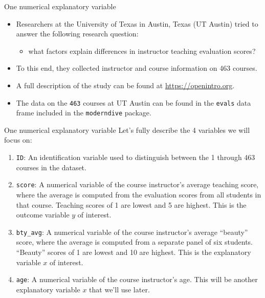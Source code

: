 \documentclass[
  ignorenonframetext,
]{beamer}
\providecommand{\tightlist}{%
  \setlength{\itemsep}{0pt}\setlength{\parskip}{0pt}}
\begin{document}
\begin{frame}[fragile]{One numerical explanatory variable}
\protect{}\label{one-numerical-explanatory-variable}
\begin{itemize}
\item
  Researchers at the University of Texas in Austin, Texas (UT Austin)
  tried to answer the following research question:

  \begin{itemize}
  \tightlist
  \item
    what factors explain differences in instructor teaching evaluation
    scores?
  \end{itemize}
\item
  To this end, they collected instructor and course information on 463
  courses.
\item
  A full description of the study can be found at
  \url{https://openintro.org}.
\item
  The data on the \texttt{463} courses at UT Austin can be found in the
  \texttt{evals} data frame included in the \texttt{moderndive} package.
\end{itemize}
\end{frame}

\begin{frame}[fragile]{One numerical explanatory variable}
\protect{}\label{one-numerical-explanatory-variable-1}
Let's fully describe the 4 variables we will focus on:

\begin{enumerate}
\item
  \texttt{ID}: An identification variable used to distinguish between
  the 1 through 463 courses in the dataset.
\item
  \texttt{score}: A numerical variable of the course instructor's
  average teaching score, where the average is computed from the
  evaluation scores from all students in that course. Teaching scores of
  1 are lowest and 5 are highest. This is the outcome variable \(y\) of
  interest.
\item
  \texttt{bty\_avg}: A numerical variable of the course instructor's
  average ``beauty'' score, where the average is computed from a
  separate panel of six students. ``Beauty'' scores of 1 are lowest and
  10 are highest. This is the explanatory variable \(x\) of interest.
\item
  \texttt{age}: A numerical variable of the course instructor's age.
  This will be another explanatory variable \(x\) that we'll use later.
\end{enumerate}
\end{frame}
\end{document}
